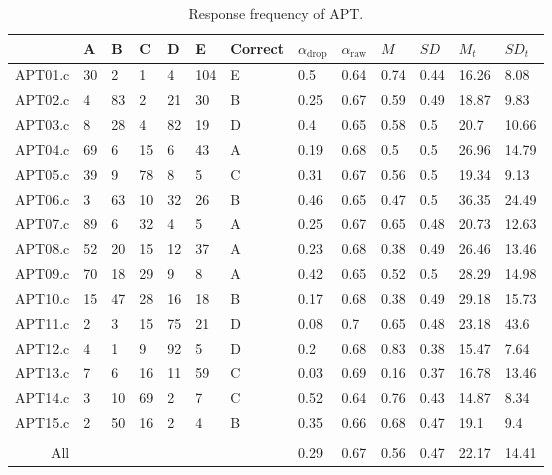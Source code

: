 \documentclass[C:/Users/sunpn505/Documents/studies/WinnerS/Erhebungen/IPhO1718/paper/problem_solving/main/main]{subfiles}
\begin{document}
\begin{table}
\caption{Response frequency of APT.}
\label{APTdescriptives}
\begin{tabular}{rllllllllllll}
  \toprule
 & A & B & C & D & E & Correct & $\alpha_{\text{drop}}$ & $\alpha_{\text{raw}}$ & $M$ & $SD$ & $M_t$ & $SD_t$ \\ 
  \midrule
APT01.c & 30 & 2 & 1 & 4 & 104 & E & 0.5 & 0.64 & 0.74 & 0.44 & 16.26 & 8.08 \\ 
  APT02.c & 4 & 83 & 2 & 21 & 30 & B & 0.25 & 0.67 & 0.59 & 0.49 & 18.87 & 9.83 \\ 
  APT03.c & 8 & 28 & 4 & 82 & 19 & D & 0.4 & 0.65 & 0.58 & 0.5 & 20.7 & 10.66 \\ 
  APT04.c & 69 & 6 & 15 & 6 & 43 & A & 0.19 & 0.68 & 0.5 & 0.5 & 26.96 & 14.79 \\ 
  APT05.c & 39 & 9 & 78 & 8 & 5 & C & 0.31 & 0.67 & 0.56 & 0.5 & 19.34 & 9.13 \\ 
  APT06.c & 3 & 63 & 10 & 32 & 26 & B & 0.46 & 0.65 & 0.47 & 0.5 & 36.35 & 24.49 \\ 
  APT07.c & 89 & 6 & 32 & 4 & 5 & A & 0.25 & 0.67 & 0.65 & 0.48 & 20.73 & 12.63 \\ 
  APT08.c & 52 & 20 & 15 & 12 & 37 & A & 0.23 & 0.68 & 0.38 & 0.49 & 26.46 & 13.46 \\ 
  APT09.c & 70 & 18 & 29 & 9 & 8 & A & 0.42 & 0.65 & 0.52 & 0.5 & 28.29 & 14.98 \\ 
  APT10.c & 15 & 47 & 28 & 16 & 18 & B & 0.17 & 0.68 & 0.38 & 0.49 & 29.18 & 15.73 \\ 
  APT11.c & 2 & 3 & 15 & 75 & 21 & D & 0.08 & 0.7 & 0.65 & 0.48 & 23.18 & 43.6 \\ 
  APT12.c & 4 & 1 & 9 & 92 & 5 & D & 0.2 & 0.68 & 0.83 & 0.38 & 15.47 & 7.64 \\ 
  APT13.c & 7 & 6 & 16 & 11 & 59 & C & 0.03 & 0.69 & 0.16 & 0.37 & 16.78 & 13.46 \\ 
  APT14.c & 3 & 10 & 69 & 2 & 7 & C & 0.52 & 0.64 & 0.76 & 0.43 & 14.87 & 8.34 \\ 
  APT15.c & 2 & 50 & 16 & 2 & 4 & B & 0.35 & 0.66 & 0.68 & 0.47 & 19.1 & 9.4 \\ 
   &  &  &  &  &  &  &  &  &  &  &  &  \\ 
  All &  &  &  &  &  &  & 0.29 & 0.67 & 0.56 & 0.47 & 22.17 & 14.41 \\ 
   \bottomrule
\end{tabular}\end{table}
\end{document}
